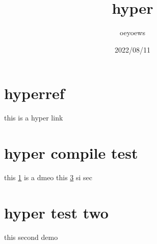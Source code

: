 \documentclass[UTF8]{article}
\title{hyper}
\author{oeyoews}
\date{2022/08/11}
\begin{document}
\maketitle

\section{hyperref}%
\label{sec:hyperref}
this is a hyper link


\section{hyper compile test}%
\label{sec:hyper compile test}

this \ref{sec:hyperref} is a dmeo
this \ref{sec:demo} si sec

\newpage

\section{hyper test two}%
\label{sec:demo}

this second \pageref{sec:hyperref} demo
\end{document}
